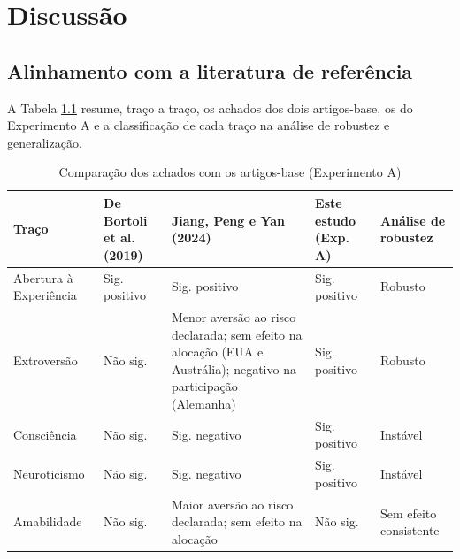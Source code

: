 \chapter{Discussão}
\label{cap:discussao}

\section{Alinhamento com a literatura de referência}
\label{sec:discussao-alinhamento}

A Tabela \ref{tab:alinhamento-literatura} resume, traço a traço, os
achados dos dois artigos-base, os do Experimento A e a classificação de
cada traço na análise de robustez e generalização.

\begin{table}[htb]
    \caption{Comparação dos achados com os artigos-base (Experimento A)}
    \label{tab:alinhamento-literatura}
    \centering
    \small
    \setlength{\tabcolsep}{4pt}
    \begin{tabular}{>{\raggedright\arraybackslash}p{2.6cm}>{\raggedright\arraybackslash}p{2.0cm}>{\raggedright\arraybackslash}p{4.4cm}>{\raggedright\arraybackslash}p{2.0cm}>{\raggedright\arraybackslash}p{2.3cm}}
        \toprule
        Traço & De Bortoli et al. (2019) & Jiang, Peng e Yan (2024) & Este estudo (Exp. A) & Análise de robustez \\
        \midrule
        Abertura à Experiência & Sig. positivo & Sig. positivo & Sig. positivo & Robusto \\
        \addlinespace
        Extroversão            & Não sig.      & Menor aversão ao risco declarada; sem efeito na alocação (EUA e Austrália); negativo na participação (Alemanha) & Sig. positivo & Robusto \\
        \addlinespace
        Consciência            & Não sig.      & Sig. negativo & Sig. positivo & Instável \\
        \addlinespace
        Neuroticismo           & Não sig.      & Sig. negativo & Sig. positivo & Instável \\
        \addlinespace
        Amabilidade            & Não sig.      & Maior aversão ao risco declarada; sem efeito na alocação & Não sig. & Sem efeito consistente \\
        \bottomrule
    \end{tabular}
\end{table}


